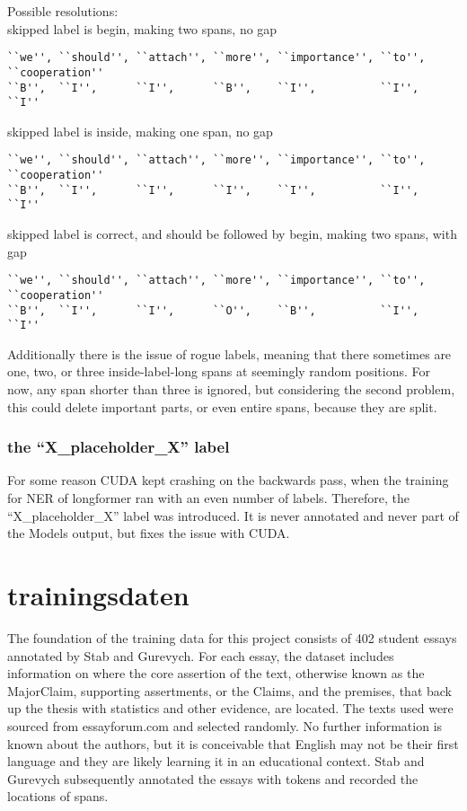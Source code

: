 \documentclass[12]{article}
\theoremstyle{mytheoremstyle}
\theoremstyle{mytheoremstyle}
\theoremstyle{myproblemstyle}
\begin{document}
  \vspace{-4ex}
  Possible resolutions:\\
  skipped label is begin, making two spans, no gap
  \vspace{-1.5ex}
  \begin{verbatim}
``we'', ``should'', ``attach'', ``more'', ``importance'', ``to'', ``cooperation''
``B'',  ``I'',      ``I'',      ``B'',    ``I'',          ``I'',  ``I''
  \end{verbatim}
  \vspace{-4ex}
  skipped label is inside, making one span, no gap
  \vspace{-1.5ex}
  \begin{verbatim}
``we'', ``should'', ``attach'', ``more'', ``importance'', ``to'', ``cooperation''
``B'',  ``I'',      ``I'',      ``I'',    ``I'',          ``I'',  ``I''
  \end{verbatim}
  \vspace{-4ex}
  skipped label is correct, and should be followed by begin, making two spans, with gap
  \vspace{-1.5ex}
  \begin{verbatim}
``we'', ``should'', ``attach'', ``more'', ``importance'', ``to'', ``cooperation''
``B'',  ``I'',      ``I'',      ``O'',    ``B'',          ``I'',  ``I''
  \end{verbatim}
  \vspace{-4ex}
  Additionally there is the issue of rogue labels, meaning that there sometimes are one, two, or three inside-label-long spans at seemingly random positions. For now, any span shorter than three is ignored, but considering the second problem, this could delete important parts, or even entire spans, because they are split.
  \subsubsection{the ``X\_placeholder\_X'' label} \label{the placeholder label}
  For some reason CUDA kept crashing on the backwards pass, when the training for NER of longformer ran with an even number of labels. Therefore, the ``X\_placeholder\_X'' label was introduced. It is never annotated and never part of the Models output, but fixes the issue with CUDA.
  \section{trainingsdaten\dotfill}
  The foundation of the training data for this project consists of 402 student essays annotated by Stab and Gurevych. For each essay, the dataset includes information on where the core assertion of the text, otherwise known as the MajorClaim, supporting assertments, or the Claims, and the premises, that back up the thesis with statistics and other evidence, are located. 
The texts used were sourced from essayforum.com and selected randomly. No further information is known about the authors, but it is conceivable that English may not be their first language and they are likely learning it in an educational context.
Stab and Gurevych subsequently annotated the essays with tokens and recorded the locations of spans.
\end{document}
